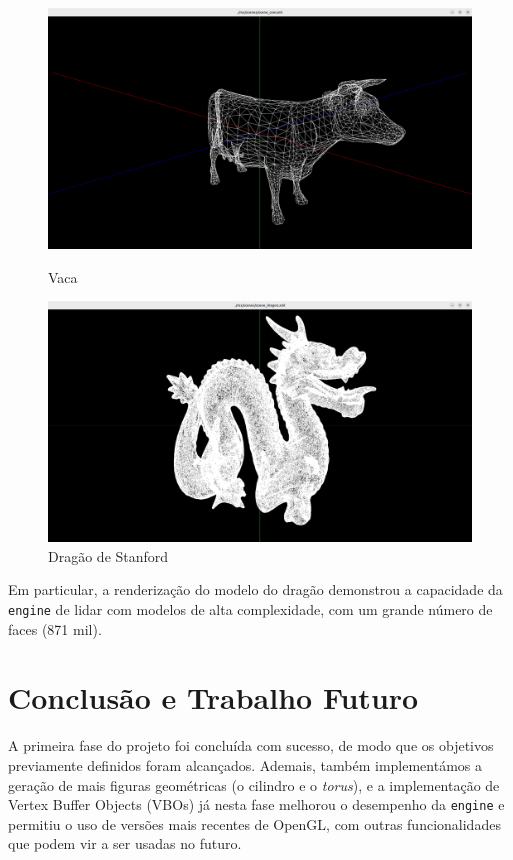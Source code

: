 \documentclass[12pt, a4paper]{article}
\begin{document}
\begin{figure}[H]
    \centering
    \begin{minipage}{0.48\textwidth}
        \centering
        \includegraphics[width=\textwidth]{res/phase1/results/Cow.png}
        \caption{Vaca}
    \end{minipage}\hfill
    \begin{minipage}{0.48\textwidth}
        \centering
        \includegraphics[width=\textwidth]{res/phase1/results/Dragon.png}
        \caption{Dragão de Stanford}
    \end{minipage}
\end{figure}

Em particular, a renderização do modelo do dragão demonstrou a capacidade da \texttt{engine} de
lidar com modelos de alta complexidade, com um grande número de faces (871 mil).

\section{Conclusão e Trabalho Futuro}

A primeira fase do projeto foi concluída com sucesso, de modo que os objetivos previamente definidos
foram alcançados. Ademais, também implementámos a geração de mais figuras geométricas (o cilindro e
o \emph{torus}), e a implementação de Vertex Buffer Objects (VBOs) já nesta fase melhorou o
desempenho da \texttt{engine} e permitiu o uso de versões mais recentes de OpenGL, com outras
funcionalidades que podem vir a ser usadas no futuro.
\end{document}
